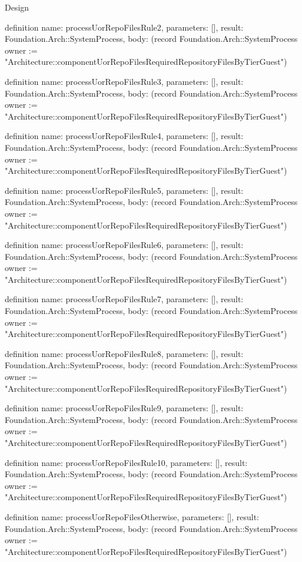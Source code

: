 \begin{lexlean}{Design}
\begin{semanticmodule}
definition{
  name: processUorRepoFilesRule2,
  parameters: [],
  result: Foundation.Arch::SystemProcess,
  body: (record Foundation.Arch::SystemProcess {owner := "Architecture::componentUorRepoFilesRequiredRepositoryFilesByTierGuest"})
}

definition{
  name: processUorRepoFilesRule3,
  parameters: [],
  result: Foundation.Arch::SystemProcess,
  body: (record Foundation.Arch::SystemProcess {owner := "Architecture::componentUorRepoFilesRequiredRepositoryFilesByTierGuest"})
}

definition{
  name: processUorRepoFilesRule4,
  parameters: [],
  result: Foundation.Arch::SystemProcess,
  body: (record Foundation.Arch::SystemProcess {owner := "Architecture::componentUorRepoFilesRequiredRepositoryFilesByTierGuest"})
}

definition{
  name: processUorRepoFilesRule5,
  parameters: [],
  result: Foundation.Arch::SystemProcess,
  body: (record Foundation.Arch::SystemProcess {owner := "Architecture::componentUorRepoFilesRequiredRepositoryFilesByTierGuest"})
}

definition{
  name: processUorRepoFilesRule6,
  parameters: [],
  result: Foundation.Arch::SystemProcess,
  body: (record Foundation.Arch::SystemProcess {owner := "Architecture::componentUorRepoFilesRequiredRepositoryFilesByTierGuest"})
}

definition{
  name: processUorRepoFilesRule7,
  parameters: [],
  result: Foundation.Arch::SystemProcess,
  body: (record Foundation.Arch::SystemProcess {owner := "Architecture::componentUorRepoFilesRequiredRepositoryFilesByTierGuest"})
}

definition{
  name: processUorRepoFilesRule8,
  parameters: [],
  result: Foundation.Arch::SystemProcess,
  body: (record Foundation.Arch::SystemProcess {owner := "Architecture::componentUorRepoFilesRequiredRepositoryFilesByTierGuest"})
}

definition{
  name: processUorRepoFilesRule9,
  parameters: [],
  result: Foundation.Arch::SystemProcess,
  body: (record Foundation.Arch::SystemProcess {owner := "Architecture::componentUorRepoFilesRequiredRepositoryFilesByTierGuest"})
}

definition{
  name: processUorRepoFilesRule10,
  parameters: [],
  result: Foundation.Arch::SystemProcess,
  body: (record Foundation.Arch::SystemProcess {owner := "Architecture::componentUorRepoFilesRequiredRepositoryFilesByTierGuest"})
}

definition{
  name: processUorRepoFilesOtherwise,
  parameters: [],
  result: Foundation.Arch::SystemProcess,
  body: (record Foundation.Arch::SystemProcess {owner := "Architecture::componentUorRepoFilesRequiredRepositoryFilesByTierGuest"})
}


\end{semanticmodule}
\end{lexlean}
